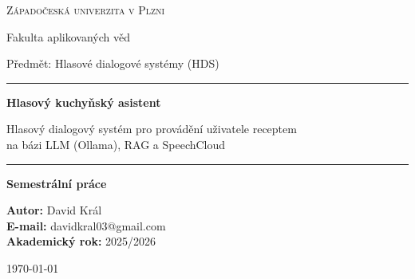 \documentclass[11pt,a4paper]{article}
\begin{document}
\begin{titlepage}
\centering
\vspace*{2cm}
{\Large\scshape Západočeská univerzita v Plzni\par}
{\large Fakulta aplikovaných věd\par}
\vspace{0.4cm}
{\large Předmět: Hlasové dialogové systémy (HDS)\par}
\vfill
{\color{accent}\rule{\linewidth}{1.4pt}}\par
\vspace{0.6cm}
{\Huge\bfseries Hlasový kuchyňský asistent\par}
\vspace{0.4cm}
{\large Hlasový dialogový systém pro provádění uživatele receptem\\ na bázi LLM (Ollama), RAG a SpeechCloud\par}
\vspace{0.6cm}
{\color{accent}\rule{\linewidth}{1.4pt}}\par
\vfill
{\large\bfseries Semestrální práce\par}
\vspace{2cm}
\begin{flushright}
\large
\textbf{Autor:} David Král\\
\textbf{E-mail:} davidkral03@gmail.com\\
\textbf{Akademický rok:} 2025/2026
\end{flushright}
\vspace{1cm}
{\large \today\par}
\end{titlepage}

\begin{abstract}
\noindent
Tato práce popisuje návrh a implementaci \textbf{hlasového kuchyňského asistenta} --
webové aplikace, která uživatele interaktivně provede vybraným receptem krok za
krokem. Uživatel nahraje libovolný recept v textové podobě; systém ho automaticky
rozloží na suroviny a jednotlivé kroky, uloží do vyhledávací (RAG) databáze a poté
ho receptem provází. Aplikace umožňuje ovládání jak \emph{psaním} v chatu, tak
\emph{hlasem} -- s rozpoznáváním řeči (ASR) a syntézou řeči (TTS) zajišťovanými
platformou SpeechCloud. Porozumění a generování odpovědí obstarává velký jazykový
model provozovaný přes Ollamu. Klíčovou vlastností je \textbf{deterministické sledování
postupu}: aplikace si v kódu drží, ve kterém kroku se uživatel nachází, takže se ve
vaření nikdy neztratí. Uživatelské rozhraní je inspirováno moderními konverzačními
asistenty -- nabízí klasický chat s možností přepnutí do plnohodnotného hlasového
režimu s přehledem konverzace.
\end{abstract}
\end{document}
